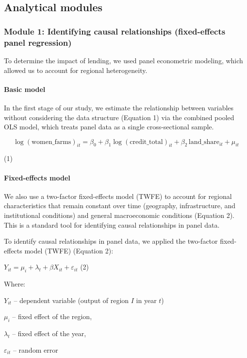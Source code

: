 ﻿\documentclass[pdflatex,sn-mathphys-ay]{sn-jnl}
\begin{document}
\subsection{Analytical modules}

\subsubsection{Module 1: Identifying causal relationships (fixed-effects panel regression)}

To determine the impact of lending, we used panel econometric modeling,
which allowed us to account for regional heterogeneity.

\paragraph{Basic model}

In the first stage of our study, we estimate the relationship between
variables without considering the data structure (Equation 1) via the
combined pooled OLS model, which treats panel data as a single
cross-sectional sample.

$$
\log(\text{women\_farms})_{it} = \beta_0 + \beta_1 \log(\text{credit\_total})_{it} + \beta_2 \, \text{land\_share}_{it} + \mu_{it}
$$

(1)

\paragraph{Fixed-effects model}

We also use a two-factor fixed-effects model (TWFE) to account for
regional characteristics that remain constant over time (geography,
infrastructure, and institutional conditions) and general macroeconomic
conditions (Equation 2). This is a standard tool for identifying causal
relationships in panel data.

To identify causal relationships in panel data, we applied the
two-factor fixed-effects model (TWFE) (Equation 2):

$Y_{it} = \mu_i + \lambda_t + \beta X_{it} + \varepsilon_{it}$ (2)

Where:

$Y_{it}$ -- dependent variable (output of region $I$ in year $t$)

$\mu_i$ -- fixed effect of the region,

$\lambda_t$ -- fixed effect of the year,

$\varepsilon_{it}$ -- random error
\end{document}
